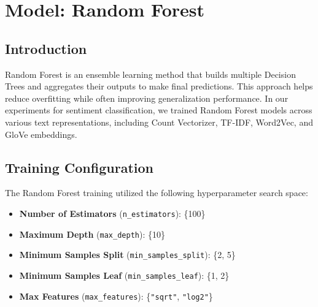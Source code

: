 \section{Model: Random Forest}

\subsection{Introduction}

Random Forest is an ensemble learning method that builds multiple Decision Trees and aggregates their outputs to make final predictions. This approach helps reduce overfitting while often improving generalization performance. In our experiments for sentiment classification, we trained Random Forest models across various text representations, including Count Vectorizer, TF-IDF, Word2Vec, and GloVe embeddings.

\subsection{Training Configuration}

The Random Forest training utilized the following hyperparameter search space:

\begin{itemize}
    \item \textbf{Number of Estimators} (\texttt{n\_estimators}): \{100\}
    \item \textbf{Maximum Depth} (\texttt{max\_depth}): \{10\}
    \item \textbf{Minimum Samples Split} (\texttt{min\_samples\_split}): \{2, 5\}
    \item \textbf{Minimum Samples Leaf} (\texttt{min\_samples\_leaf}): \{1, 2\}
    \item \textbf{Max Features} (\texttt{max\_features}): \{\texttt{"sqrt"}, \texttt{"log2"}\}
\end{itemize}



